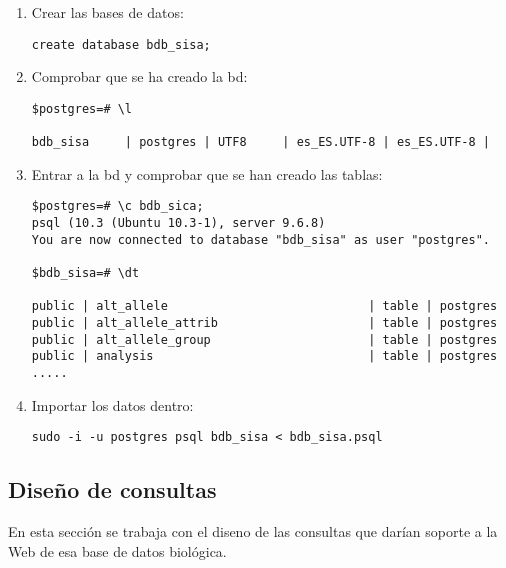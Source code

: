 \documentclass[12pt,a4paper]{article}
\begin{document}
\begin{enumerate}
Haciendo este cambio sobre todas las bases de datos, se corrige el error y ya se pueden crear las bases de datos e introducirle los datos del archivo psql correcto (\verb|bdb_sisa.psql| ).

\item Crear las bases de datos:
\begin{verbatim}
create database bdb_sisa;
\end{verbatim}

\item Comprobar que se ha creado la bd:
\begin{verbatim}
$postgres=# \l

bdb_sisa     | postgres | UTF8     | es_ES.UTF-8 | es_ES.UTF-8 | 
\end{verbatim}

\item Entrar a la bd y comprobar que se han creado las tablas:
\begin{verbatim}
$postgres=# \c bdb_sica;
psql (10.3 (Ubuntu 10.3-1), server 9.6.8)
You are now connected to database "bdb_sisa" as user "postgres".

$bdb_sisa=# \dt

public | alt_allele                            | table | postgres
public | alt_allele_attrib                     | table | postgres
public | alt_allele_group                      | table | postgres
public | analysis                              | table | postgres
.....
\end{verbatim}

\item Importar los datos dentro: 

\begin{verbatim} 
sudo -i -u postgres psql bdb_sisa < bdb_sisa.psql
\end{verbatim}


\end{enumerate}






\newpage
\subsection{Diseño de consultas} \label{pto22}

En esta sección se trabaja con el diseno de las consultas que darían soporte a la Web de esa base de datos biológica.
\end{document}
